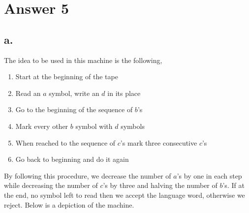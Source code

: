 \documentclass[12pt]{article}
\begin{document}
\section*{Answer 5}

\subsection*{a.}
The idea to be used in this machine is the following,
\begin{enumerate}
    \item Start at the beginning of the tape
    \item Read an $a$ symbol, write an $d$ in its place
    \item Go to the beginning of the sequence of $b$'s
    \item Mark every other $b$ symbol with $d$ symbols
    \item When reached to the sequence of $c$'s mark three consecutive $c$'s
    \item Go back to beginning and do it again
\end{enumerate}
By following this procedure, we decrease the number of $a$'s by one in each step while decreasing the number of $c$'s by three and halving the number of $b$'s. If at the end, no symbol left to read then we accept the language word, otherwise we reject. Below is a depiction of the machine.
\end{document}
